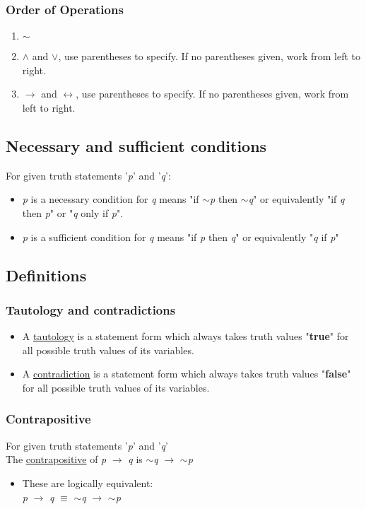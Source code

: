 \documentclass{article}
\begin{document}
\subsubsection{Order of Operations}
\begin{enumerate}
\item $\sim$
\item $\wedge$ and $\lor$, use parentheses to specify. If no parentheses given, work from left to right.
\item  $\rightarrow$ and $\leftrightarrow$, use parentheses to specify. If no parentheses given, work from left to right.
\end{enumerate}

\subsection{Necessary and sufficient conditions}
For given truth statements '\textit{p}' and '\textit{q}':
\begin{itemize}
\item \textit{p} is a necessary condition for \textit{q} means "if $\sim$\textit{p} then $\sim$\textit{q}" or
equivalently "if \textit{q} then \textit{p}" or "\textit{q} only if \textit{p}".
\item \textit{p} is a sufficient condition for \textit{q} means "if \textit{p} then \textit{q}" or equivalently
"\textit{q} if \textit{p}"
\end{itemize}

\subsection{Definitions}
\subsubsection{Tautology and contradictions}
\begin{itemize}
\item A \underline{tautology} is a statement form which always takes truth values "\textbf{true}" for all possible
truth values of its variables.
\item A \underline{contradiction} is a statement form which always takes truth values "\textbf{false}" for all possible
truth values of its variables.
\end{itemize}

\subsubsection{Contrapositive}
For given truth statements '\textit{p}' and '\textit{q}' \\
The \underline{contrapositive} of \textit{p} $\rightarrow$ \textit{q} is $\sim$\textit{q} $\rightarrow$ $\sim$\textit{p}
\begin{itemize}
\item These are logically equivalent: \\
\textit{p} $\rightarrow$ \textit{q} $\equiv$  $\sim$\textit{q} $\rightarrow$ $\sim$\textit{p}
\end{itemize}
\end{document}
